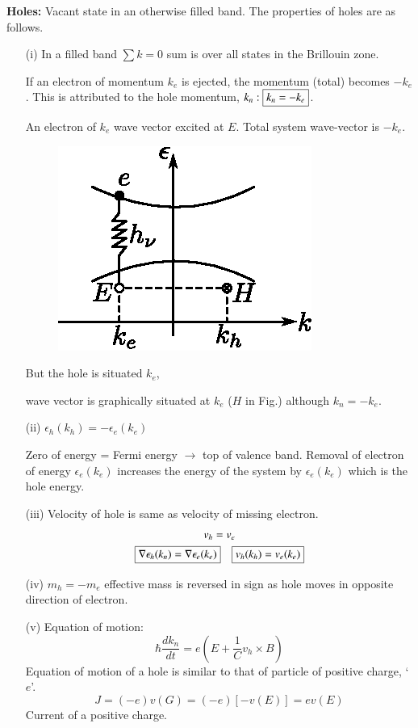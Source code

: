 \noindent
{\bf Holes:} Vacant state in an otherwise filled band. The properties of holes are as follows.
\begin{itemize}
\item[(i)] In a filled band $\sum k=0$ sum is over all states in the Brillouin zone.

If an electron of momentum $k_{e}$ is ejected, the momentum (total) becomes $-k_{e}$. This is attributed to the hole momentum, $k_{n}:\fbox{$k_{n}=-k_{e}$}$.

An electron of $k_{e}$ wave vector excited at $E$. Total system wave-vector is $-k_{e}$.
\begin{figure}[H]
\centering
\includegraphics{images/lecture23/fig5.eps}
\end{figure}

But the hole is situated $k_{e}$,

wave vector is graphically situated at $k_{e}$ ($H$ in Fig.) although $k_{n}=-k_{e}$.

\item[(ii)] $\epsilon_{h}(k_{h})=-\epsilon_{e}(k_{e})$

Zero of energy = Fermi energy $\to$ top of valence band. Removal of electron of energy $\epsilon_{e}(k_{e})$ increases the energy of the system by $\epsilon_{e}(k_{e})$ which is the hole energy.

\item[(iii)] Velocity of hole is same as velocity of missing electron.
\begin{gather*}
v_{h}=v_{e}\\
\fbox{$\nabla \epsilon_{h}(k_{n})=\nabla \epsilon_{e}(k_{e})$}\quad\fbox{$v_{h}(k_{h})=v_{e}(k_{e})$}
\end{gather*}

\item[(iv)] $m_{h}=-m_{e}$ effective mass is reversed in sign as hole moves in opposite direction of electron.

\item[(v)] Equation of motion:
$$
\hbar \dfrac{dk_{n}}{dt}=e\left(E+\dfrac{1}{C}v_{h}\times B\right)
$$
Equation of motion of a hole is similar to that of particle of positive charge, `$e$'.
$$
J=(-e)v(G)=(-e)[-v(E)]=ev(E)
$$
Current of a positive charge.
\end{itemize}

